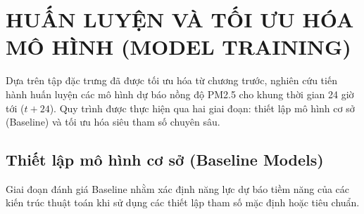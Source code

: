 \chapter{HUẤN LUYỆN VÀ TỐI ƯU HÓA MÔ HÌNH (MODEL TRAINING)}
Dựa trên tập đặc trưng đã được tối ưu hóa từ chương trước, nghiên cứu tiến hành huấn luyện các mô hình dự báo nồng độ PM2.5 cho khung thời gian 24 giờ tới ($t+24$). Quy trình được thực hiện qua hai giai đoạn: thiết lập mô hình cơ sở (Baseline) và tối ưu hóa siêu tham số chuyên sâu.
\section{Thiết lập mô hình cơ sở (Baseline Models)}
Giai đoạn đánh giá Baseline nhằm xác định năng lực dự báo tiềm năng của các kiến trúc thuật toán khi sử dụng các thiết lập tham số mặc định hoặc tiêu chuẩn.
